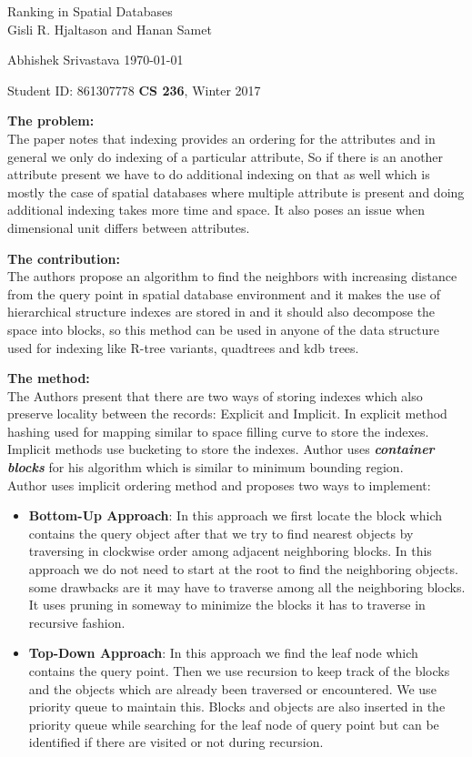 \documentclass[a4paper,12pt, twoside]{article}
\renewcommand{\maketitle}{%
 	\Large
 	\begin{center}
 	Ranking in Spatial Databases \\	
 	\normalsize Gisli R. Hjaltason and Hanan Samet
 	\end{center}
 
 	\Large
	Abhishek Srivastava
	\hfill
	\normalsize
	\today
 	\par
 	Student ID: 861307778
 	\hfill
 	\textbf{CS 236}, Winter 2017
 	\par 	
 	\hrulefill
 	\par
 	}
\begin{document}
\thispagestyle{empty}
	
\maketitle

\textbf{The problem:}\\
The paper notes that indexing provides an ordering for the attributes and in general we only do indexing of a particular attribute, So if there is an another attribute present we have to do additional indexing on that as well which is mostly the case of spatial databases where multiple attribute is present and doing additional indexing takes more time and space. It also poses an issue when dimensional unit differs between attributes.  

\textbf{The contribution:}\\
The authors propose an algorithm to find the neighbors with increasing distance from the query point in spatial database environment and it makes the use of hierarchical structure indexes are stored in and it should also decompose the space into blocks, so this method can be used in anyone of the data structure used for indexing like R-tree variants, quadtrees and kdb trees.

\textbf{The method:}\\
The Authors present that there are two ways of storing indexes which also preserve locality between the records: Explicit and Implicit. In explicit method hashing used for mapping similar to space filling curve to store the indexes. Implicit methods use bucketing to store the indexes. Author uses \textbf{\emph{container blocks}} for his algorithm which is similar to minimum bounding region.\\

Author uses implicit ordering method and proposes two ways to implement: 
\begin{itemize}
	\item \textbf{Bottom-Up Approach}: In this approach we first locate the block which contains the query object after that we try to find nearest objects by traversing in clockwise order among adjacent neighboring blocks. In this approach we do not need to start at the root to find the neighboring objects. some drawbacks are it may have to traverse among all the neighboring blocks. It uses pruning in someway to minimize the blocks it has to traverse in recursive fashion.
	\item \textbf{Top-Down Approach}: In this approach we find the leaf node which contains the query point. Then we use recursion to keep track of the blocks and the objects which are already been traversed or encountered. We use priority queue to maintain this. Blocks and objects are also inserted in the priority queue while searching for the leaf node of query point but can be identified if there are visited or not during recursion.   
\end{itemize}
\end{document}
